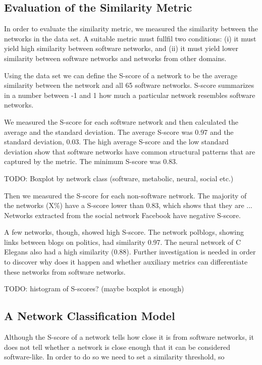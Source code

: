
\subsection{Evaluation of the Similarity Metric}

In order to evaluate the similarity metric, we measured the similarity between
the networks in the data set. A suitable metric must fullfil two conditions: (i)
it must yield high similarity between software networks, and (ii) it must yield
lower similarity between software networks and networks from other domains.

Using the data set we can define the S-score of a network to be the average
similarity between the network and all 65 software networks. S-score summarizes
in a number between -1 and 1 how much a particular network resembles software
networks.

We measured the S-score for each software network and then calculated the
average and the standard deviation. The average S-score was 0.97 and the
standard deviation, 0.03. The high average S-score and the low standard
deviation show that software networks have common structural patterns that are
captured by the metric. The minimum S-score was 0.83.

TODO: Boxplot by network class (software, metabolic, neural, social etc.)

Then we measured the S-score for each non-software network. The majority of the
networks (X\%) have a S-score lower than 0.83, which shows that they
are ... Networks extracted from the social network Facebook have negative
S-score.

A few networks, though, showed high S-score. The network
polblogs, showing links between blogs on politics, had similarity 0.97. The
neural network of C Elegans also had a high similarity (0.88). Further
investigation is needed in order to discover why does it happen and whether
auxiliary metrics can differentiate these networks from software networks.

TODO: histogram of S-scores? (maybe boxplot is enough)

\subsection{A Network Classification Model}

Although the S-score of a network tells how close it is from software
networks, it does not tell whether a network is close enough that it can be
considered software-like. In order to do so we need to set a similarity
threshold, so 

